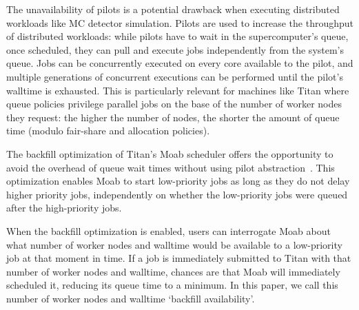 The unavailability of pilots is a potential drawback when executing distributed
workloads like MC detector simulation. Pilots are used to increase the
throughput of distributed workloads: while pilots have to wait in the
supercomputer's queue, once scheduled, they can pull and execute jobs
independently from the system's queue. Jobs can be concurrently executed on
every core available to the pilot, and multiple generations of concurrent
executions can be performed until the pilot's walltime is exhausted. This is
particularly relevant for machines like Titan where queue policies privilege
parallel jobs on the base of the number of worker nodes they request: the higher
the number of nodes, the shorter the amount of queue time (modulo fair-share and
allocation policies).



The backfill optimization of Titan's Moab scheduler offers the opportunity to
avoid the overhead of queue wait times without using pilot
abstraction~\cite{maui_backfill_url}. This optimization enables Moab to start
low-priority jobs as long as they do not delay higher priority jobs,
independently on whether the low-priority jobs were queued after the
high-priority jobs.

When the backfill optimization is enabled, users can interrogate Moab about what
number of worker nodes and walltime would be available to a low-priority job at
that moment in time. If a job is immediately submitted to Titan with that number
of worker nodes and walltime, chances are that Moab will immediately scheduled
it, reducing its queue time to a minimum. In this paper, we call this number of
worker nodes and walltime `backfill availability'.


